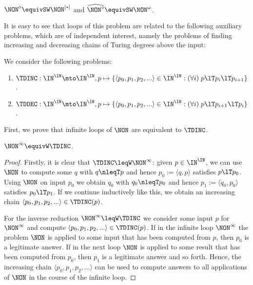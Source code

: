 \begin{cor}
\label{cor:NON}
$\NON^\diamond\equivSW\NON^{[*]}$ and $\widehat{\NON^\diamond}\equivSW \NON^\omega$.
\end{cor}

\noindent
It is easy to see that loops of this problem are related to the following auxiliary problems, which are of independent interest,
namely the problems of finding increasing and decreasing chains of Turing degrees above the input:

\begin{defi}
We consider the following problems:
\begin{enumerate}
\item $\TDINC:\IN^\IN\mto\IN^\IN,p\mapsto\{\langle p_0,p_1,p_2,...\rangle\in\IN^\IN:(\forall i)\;p\lT p_i\lT p_{i+1}\}$.
\item $\TDDEC:\IN^\IN\mto\IN^\IN,p\mapsto\{\langle p_0,p_1,p_2,...\rangle\in\IN^\IN:(\forall i)\;p\lT p_{i+1}\lT p_{i}\}$.
\end{enumerate}
\end{defi}

\noindent
First, we prove that infinite loops of $\NON$ are equivalent to $\TDINC$.

\begin{prop}
\label{prop:TDINC}
$\NON^\infty\equivW\TDINC$.
\end{prop}
\begin{proof}
Firstly, it is clear that $\TDINC\leqW\NON^\infty$: given $p\in\IN^\IN$, we can use $\NON$
to compute some $q$ with $q\nleqT p$ and hence $p_0:=\langle q,p\rangle$ satisfies $p\lT p_0$.
Using $\NON$ on input $p_0$ we obtain $q_0$ with $q_0\nleqT p_0$ and hence $p_1:=\langle q_0,p_0\rangle$
satisfies $p_0\lT p_1$. If we continue inductively like this, we obtain an increasing chain $\langle p_0,p_1,p_2,...\rangle\in\TDINC(p)$.

For the inverse reduction $\NON^\infty\leqW\TDINC$ we consider some input $p$ for $\NON^\infty$
and compute $\langle p_0,p_1,p_2,...\rangle\in\TDINC(p)$. If in the infinite loop $\NON^\infty$ the
problem $\NON$ is applied to some input that has been computed from $p$, then $p_0$ is a legitimate answer.
If in the next loop $\NON$ is applied to some result that has been computed from $p_0$, then $p_1$ is a 
legitimate answer and so forth. Hence, the increasing chain $\langle p_0,p_1,p_2,...\rangle$ can be used
to compute answers to all applications of $\NON$ in the course of the infinite loop. 
\end{proof}

